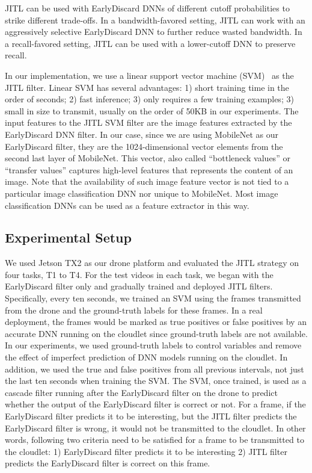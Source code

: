 JITL can be used with EarlyDiscard DNNs of different cutoff probabilities to
strike different trade-offs. In a bandwidth-favored setting, JITL can work with
an aggressively selective EarlyDiscard DNN to further reduce wasted bandwidth. In
a recall-favored setting, JITL can be used with a lower-cutoff DNN to preserve
recall.

In our implementation, we use a linear support vector machine
(SVM)~\cite{Friedman2001} as the JITL filter. Linear SVM has several advantages:
1) short training time in the order of seconds; 2) fast inference; 3) only
requires a few training examples; 3) small in size to transmit, usually on the
order of 50KB in our experiments. The input features to the JITL SVM filter are
the image features extracted by the EarlyDiscard DNN filter. In our case, since
we are using MobileNet as our EarlyDiscard filter, they are the 1024-dimensional
vector elements from the second last layer of MobileNet. This vector, also
called ``bottleneck values'' or ``transfer values'' captures high-level features
that represents the content of an image. Note that the availability of such
image feature vector is not tied to a particular image classification DNN nor
unique to MobileNet. Most image classification DNNs can be used as a feature
extractor in this way.

\subsection{Experimental Setup}
We used Jetson TX2 as our drone platform and evaluated the JITL strategy on four
tasks, T1 to T4. For the test videos in each task, we began with the
EarlyDiscard filter only and gradually trained and deployed JITL filters.
Specifically, every ten seconds, we trained an SVM using the frames transmitted
from the drone and the ground-truth labels for these frames. In a real
deployment, the frames would be marked as true positives or false positives by
an accurate DNN running on the cloudlet since ground-truth labels are not
available. In our experiments, we used ground-truth labels to control variables
and remove the effect of imperfect prediction of DNN models running on the
cloudlet. In addition, we used the true and false positives from all previous
intervals, not just the last ten seconds when training the SVM. The SVM, once
trained, is used as a cascade filter running after the EarlyDiscard filter on
the drone to predict whether the output of the EarlyDiscard filter is correct or
not. For a frame, if the EarlyDiscard filter predicts it to be interesting, but
the JITL filter predicts the EarlyDiscard filter is wrong, it would not be
transmitted to the cloudlet. In other words, following two criteria need to be
satisfied for a frame to be transmitted to the cloudlet: 1) EarlyDiscard filter
predicts it to be interesting 2) JITL filter predicts the EarlyDiscard filter is
correct on this frame.

